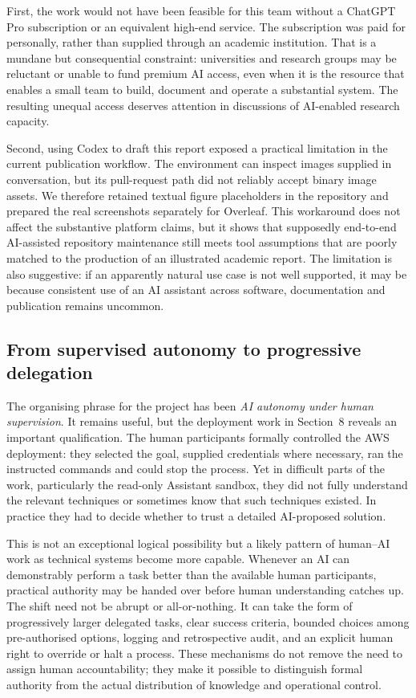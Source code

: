 First, the work would not have been feasible for this team without a ChatGPT
Pro subscription or an equivalent high-end service. The subscription was paid
for personally, rather than supplied through an academic institution. That is
a mundane but consequential constraint: universities and research groups may
be reluctant or unable to fund premium AI access, even when it is the resource
that enables a small team to build, document and operate a substantial system.
The resulting unequal access deserves attention in discussions of AI-enabled
research capacity.

Second, using Codex to draft this report exposed a practical limitation in the
current publication workflow. The environment can inspect images supplied in
conversation, but its pull-request path did not reliably accept binary image
assets. We therefore retained textual figure placeholders in the repository
and prepared the real screenshots separately for Overleaf. This workaround
does not affect the substantive platform claims, but it shows that supposedly
end-to-end AI-assisted repository maintenance still meets tool assumptions
that are poorly matched to the production of an illustrated academic report.
The limitation is also suggestive: if an apparently natural use case is not
well supported, it may be because consistent use of an AI assistant across
software, documentation and publication remains uncommon.

\subsection{From supervised autonomy to progressive delegation}

The organising phrase for the project has been \emph{AI autonomy under human
supervision}. It remains useful, but the deployment work in Section~8 reveals
an important qualification. The human participants formally controlled the
AWS deployment: they selected the goal, supplied credentials where necessary,
ran the instructed commands and could stop the process. Yet in difficult parts
of the work, particularly the read-only Assistant sandbox, they did not fully
understand the relevant techniques or sometimes know that such techniques
existed. In practice they had to decide whether to trust a detailed AI-proposed
solution.

This is not an exceptional logical possibility but a likely pattern of
human--AI work as technical systems become more capable. Whenever an AI can
demonstrably perform a task better than the available human participants,
practical authority may be handed over before human understanding catches up.
The shift need not be abrupt or all-or-nothing. It can take the form of
progressively larger delegated tasks, clear success criteria, bounded choices
among pre-authorised options, logging and retrospective audit, and an explicit
human right to override or halt a process. These mechanisms do not remove the
need to assign human accountability; they make it possible to distinguish
formal authority from the actual distribution of knowledge and operational
control.

